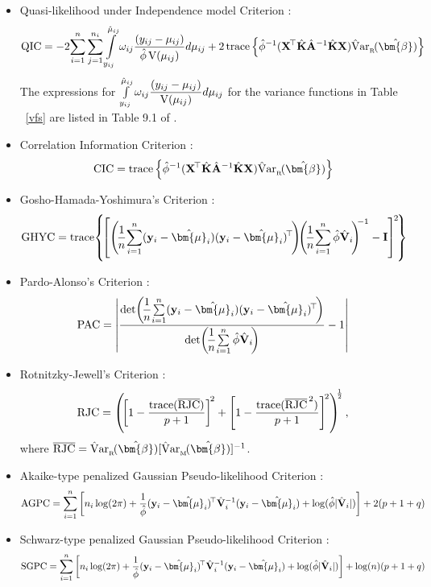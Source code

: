 \begin{itemize}
\item Quasi-likelihood under Independence model Criterion \citep{P01}:
$${\rm QIC}=-2\!\sum\limits_{i=1}^n\sum\limits_{j=1}^{n_i}\int\limits_{y_{ij}}^{\hat{\mu}_{ij}}\omega_{ij}\dfrac{(y_{ij}-\mu_{ij})}{\hat{\phi}\,{\rm V}(\mu_{ij})}d\mu_{ij}+2\,{\rm trace}\left\{\hat{\phi}^{-1}({\bf X}^{\!\top}\hat{\bf K}\hat{\bf A}^{-1}\hat{\bf K}{\bf X}){\rm \hat{V}ar}_{_{\rm R}}\!(\hat{\bm{\beta}})\right\}$$
The expressions for $\int\limits_{y_{ij}}^{\hat{\mu}_{ij}}\omega_{ij}\dfrac{(y_{ij}-\mu_{ij})}{{\rm V}(\mu_{ij})}d\mu_{ij}$ for the variance functions 
in Table ~\ref{vfs} are listed in Table 9.1 of \cite{MN89}.

\item Correlation Information Criterion \citep{HW09}:
$${\rm CIC}={\rm trace}\left\{\hat{\phi}^{-1}({\bf X}^{\!\top}\hat{\bf K}\hat{\bf A}^{-1}\hat{\bf K}{\bf X}){\rm \hat{V}ar}_{_{\rm R}}\!(\hat{\bm{\beta}})\right\}$$

\item Gosho-Hamada-Yoshimura’s Criterion \citep{GHY11,G14}:
$${\rm GHYC}={\rm trace}\!\left\{\!\left[\left(\!\dfrac{1}{n}\!\sum\limits_{i=1}^n({\bf y}_i-\hat{\bm{\mu}}_i)({\bf y}_i-\hat{\bm{\mu}}_i)^{\!\top}\!\right)\!\!\left(\!\dfrac{1}{n}\!\sum\limits_{i=1}^n\hat{\phi}\hat{\bf V}_i\!\right)^{\!\!-1}-{\bf I}\right]^{\!2}\!\right\}$$

\item Pardo-Alonso’s Criterion \citep{PA19}:
$${\rm PAC}=\left|\dfrac{{\rm det}\!\left(\!\dfrac{1}{n}\!\sum\limits_{i=1}^n({\bf y}_i-\hat{\bm{\mu}}_i)({\bf y}_i-\hat{\bm{\mu}}_i)^{\!\top}\!\right)}{{\rm det}\!\left(\!\dfrac{1}{n}\!\sum\limits_{i=1}^n\hat{\phi}\hat{\bf V}_i\!\right)}-1\right|$$

\item Rotnitzky-Jewell’s Criterion \citep{HCW07}:
$${\rm RJC}=\left(\!\left[1-\dfrac{{\rm trace}(\overline{\rm RJC})}{p+1}\right]^{\!2}+\left[1-\dfrac{{\rm trace}(\overline{\rm RJC}^{\,2})}{p+1}\right]^{\!2}\right)^{\!\!\frac{1}{2}},$$
where $\overline{\rm RJC}={\rm \hat{V}ar}_{_{\rm R}}\!(\hat{\bm{\beta}})[{\rm \hat{V}ar}_{_{\rm M}}\!(\hat{\bm{\beta}})]^{-1}$.

\item {Akaike-type penalized Gaussian Pseudo-likelihood Criterion} \citep{CW11,ZZ13,FHW18}:
$${\rm AGPC}=\sum\limits_{i=1}^n\left[n_i\log(2\pi) + \dfrac{1}{\hat{\phi}}({\bf y}_i-\hat{\bm{\mu}}_i)^{\!\top}\hat{\bf V}_i^{-1}({\bf y}_i-\hat{\bm{\mu}}_i)+\log(\hat{\phi}|\hat{\bf V}_i|)\right]+2(p+1+q)$$

\item{Schwarz-type penalized Gaussian Pseudo-likelihood Criterion} \citep{CW11,ZZ13,FHW18}:
$${\rm SGPC}=\sum\limits_{i=1}^n\left[n_i\log(2\pi) + \dfrac{1}{\hat{\phi}}({\bf y}_i-\hat{\bm{\mu}}_i)^{\!\top}\hat{\bf V}_i^{-1}({\bf y}_i-\hat{\bm{\mu}}_i)+\log(\hat{\phi}|\hat{\bf V}_i|)\right]+\log(n)(p+1+q)$$
\end{itemize}

